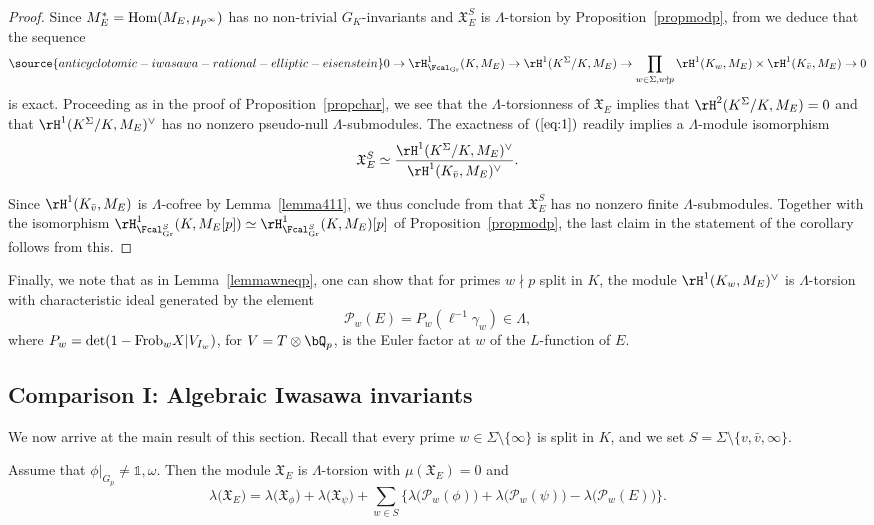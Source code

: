 \begin{proof}
Since $M_E^*={\rm Hom}(M_E,\mu_{p^\infty})$ has no non-trivial $G_K$-invariants and $\mathfrak{X}_E^S$ is $\Lambda$-torsion by Proposition~\ref{propmodp}, from \cite[Prop.~A.2]{pollack2011anticyclotomic} we deduce that the sequence
\begin{equation}\label{eq:1}
\source{anticyclotomic-iwasawa-rational-elliptic-eisenstein}
0 \rightarrow \rH^1_{\Fcal_{\rm Gr}}(K,M_E) \rightarrow \rH^{1}(K^{\Sigma}/K, M_E) \rightarrow \prod_{w\in\Sigma, w\nmid p}\rH^1(K_w,M_E)\times\rH^{1}(K_{\bar{v}}, M_E) \rightarrow 0
\end{equation}
is exact. Proceeding as in the proof of Proposition~\ref{propchar}, we see that the $\Lambda$-torsionness of $\mathfrak{X}_E$ implies that $\rH^{2}(K^{\Sigma}/K, M_E)=0$ and that $\rH^{1}(K^{\Sigma}/K, M_E)^{\vee}$ has no nonzero pseudo-null $\Lambda$-submodules. The exactness of $(\ref{eq:1})$ readily implies a $\Lambda$-module isomorphism
\[
\mathfrak{X}_E^S\simeq\frac{\rH^1(K^\Sigma/K,M_E)^\vee}{\rH^{1}(K_{\bar{v}}, M_E)^\vee}.
\]

Since $\rH^1(K_{\bar{v}},M_E)$ is $\Lambda$-cofree by Lemma~\ref{lemma411}, we thus conclude from \cite[Lem.~2.6]{greenvats} that $\mathfrak{X}_E^S$ has no nonzero finite $\Lambda$-submodules. Together with the isomorphism  $\rH^1_{\Fcal_{\rm Gr}^S}(K,M_E[p]) \simeq \rH^1_{\Fcal_{\rm Gr}^S}(K,M_E)[p]$ of Proposition~\ref{propmodp}, the last claim in the statement
of the corollary follows from this.
\end{proof}


Finally, we note that as in Lemma~\ref{lemmawneqp}, one can show that for primes $w\nmid p$ split in $K$, the module $\rH^1(K_w,M_E)^\vee$ is $\Lambda$-torsion with characteristic ideal generated by the element
\[
\mathcal{P}_w(E)=P_w(\ell^{-1}\gamma_w)
\in\Lambda,
\]
where $P_w={\rm det}(1-{\rm Frob}_wX\vert V_{I_w})$, for $V=T\otimes\bQ_p$, is the Euler factor at $w$ of the $L$-function of $E$.


\subsection{Comparison I: Algebraic Iwasawa invariants}

We now arrive at the main result of this section. Recall that every prime $w\in\Sigma\setminus\{\infty\}$ is split in $K$, and we set $S=\Sigma\setminus\{v,\bar{v},\infty\}$.

\begin{theorem}
\notready\label{MAINalgside}
Assume that $\phi\vert_{G_p}\neq\mathds{1},\omega$. Then the module $\mathfrak{X}_{E}$ is $\Lambda$-torsion with $\mu(\mathfrak{X}_{E})=0$ and
\begin{displaymath}
\lambda\bigl(\mathfrak{X}_E\bigr)=\lambda\bigl(\mathfrak{X}_\phi\bigr)+\lambda\bigl(\mathfrak{X}_\psi\bigr)
+\sum_{w\in S} \lbrace \lambda\bigl(\mathcal{P}_w(\phi)\bigr)+\lambda\bigl(\mathcal{P}_w(\psi)\bigr)-\lambda\bigl(\mathcal{P}_w(E)\bigr) \rbrace.
\end{displaymath}
\end{theorem}

